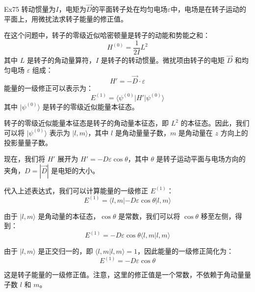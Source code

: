 \begin{question}{Ex75}
    转动惯量为$I$，电矩为$\vec{D}$的平面转子处在均匀电场$\varepsilon$中，电场是在转子运动的平面上，用微扰法求转子能量的修正值。
\end{question}
\begin{solution}
    在这个问题中，转子的零级近似哈密顿量是转子的动能和势能之和：
    $$
        H^{(0)} = \frac{1}{2I}L^2
    $$
    其中 $L$ 是转子的角动量算符，$I$ 是转子的转动惯量。微扰项由转子的电矩 $\vec{D}$ 和均匀电场 $\varepsilon$ 组成：
    $$
        H' = -\vec{D} \cdot \varepsilon
    $$
    能量的一级修正可以表示为：
    $$
        E^{(1)} = \langle \psi^{(0)} | H' | \psi^{(0)} \rangle
    $$
    其中 $|\psi^{(0)}\rangle$ 是转子的零级近似能量本征态。

    转子的零级近似能量本征态是转子的角动量本征态，即 $L^2$ 的本征态。因此，我们可以将 $|\psi^{(0)}\rangle$ 表示为 $|l, m\rangle$，其中 $l$ 是角动量量子数，$m$ 是角动量在 $z$ 方向上的投影量量子数。

    现在，我们将 $H'$ 展开为 $H' = -D\varepsilon \cos \theta$，其中 $\theta$ 是转子运动平面与电场方向的夹角，$D = |\vec{D}|$ 是电矩的大小。

    代入上述表达式，我们可以计算能量的一级修正 $E^{(1)}$：
    $$
        E^{(1)} = \langle l, m | -D\varepsilon \cos \theta | l, m \rangle
    $$

    由于 $|l, m\rangle$ 是角动量的本征态，$\cos \theta$ 是常数，我们可以将 $\cos \theta$ 移至左侧，得到：
    $$
        E^{(1)} = -D\varepsilon \cos \theta \langle l, m | l, m \rangle
    $$

    由于 $|l, m\rangle$ 是正交归一的，即 $\langle l, m | l, m \rangle = 1$，因此能量的一级修正简化为：
    $$
        E^{(1)} = -D\varepsilon \cos \theta
    $$

    这是转子能量的一级修正值。注意，这里的修正值是一个常数，不依赖于角动量量子数 $l$ 和 $m$。
\end{solution}




